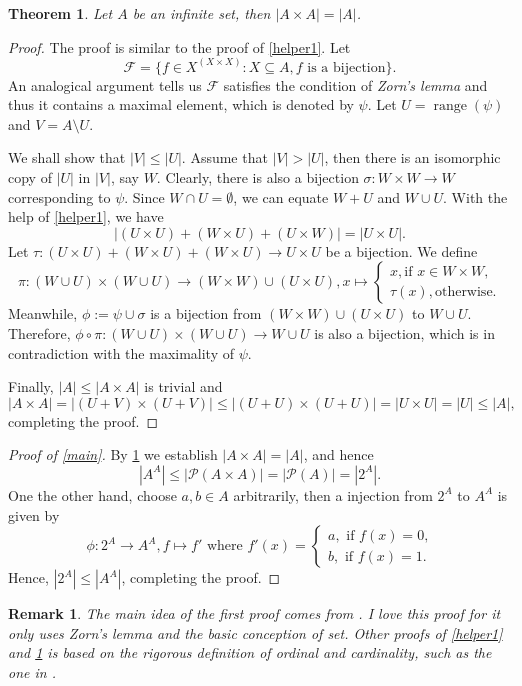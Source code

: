 \documentclass[12pt]{article}
\theoremstyle{mythm}
\newtheorem{theorem}{Theorem}
\newtheorem*{remark}{Remark}
\newcommand\pp{\mathcal{P}}
\newcommand\ff{\mathcal{F}}
\DeclareMathOperator{\range}{range}
\begin{document}
\begin{theorem} \label{helper2}
    Let $A$ be an infinite set, then $|A \times A| = |A|$. 
\end{theorem}  

\begin{proof}
    The proof is similar to the proof of \cref{helper1}. Let
    $$
    \ff = \{f \in X^{(X \times X)} : X \subseteq A, f \text{ is a bijection}\}.
    $$
    An analogical argument tells us $\ff$ satisfies the condition of \textit{Zorn's lemma}
    and thus it contains a maximal element, which is denoted by $\psi$. 
    Let $U = \range(\psi)$ and $V = A \setminus U$. 
    
    We shall show that 
    $|V| \leq |U|$. Assume that $|V| > |U|$, then there is an isomorphic copy of 
    $|U|$ in $|V|$, say $W$. Clearly, there is also a bijection 
    $\sigma : W \times W \to W$ corresponding to $\psi$.
    Since $W \cap U = \emptyset$, we can equate $W + U$ and $W \cup U$. 
    With the help of \cref{helper1}, we have 
    $$
    |(U \times U) + (W \times U) + (U \times W)| = |U \times U|.
    $$
    Let $\tau : (U \times U) + (W \times U) + (W \times U) \to U \times U$ be a bijection.
    We define 
    $$
        \pi : (W\cup U) \times (W \cup U) \to (W \times W) \cup (U \times U), 
        x \mapsto \begin{cases}
            x ,  \text{if $x \in W \times W$}, \\
            \tau(x), \text{otherwise}.
        \end{cases}
    $$
    Meanwhile, $\phi := \psi \cup \sigma$ is a bijection from 
    $(W \times W) \cup (U \times U)$ to $W \cup U$. Therefore, 
    $\phi \circ \pi : (W\cup U) \times (W \cup U) \to W \cup U$ is 
    also a bijection, which is in contradiction with the maximality of $\psi$.

    Finally, $|A| \leq |A \times A|$ is trivial and
    $$
    |A \times A| = |(U+V) \times (U+V)| \leq |(U+U) \times (U+U)| = |U \times U| = |U| \leq |A|,
    $$
    completing the proof.
\end{proof}

\begin{proof}[Proof of \cref{main}]
By \cref{helper2} we establish $|A \times A| = |A|$,
and hence 
$$
|A^A| \leq |\pp(A \times A)| = |\pp(A)| = |2^A|.
$$
One the other hand, choose $a,b \in A$ arbitrarily, then a injection 
from $2^A$ to $A^A$ is given by 
$$
\phi : 2^A \to A^A, f \mapsto f' \text{ where }
f'(x) = \begin{cases}
    a, \text{ if $f(x) = 0$,} \\
    b, \text{ if $f(x) = 1$.}
\end{cases}
$$
Hence, $|2^A| \leq |A^A|$, completing the proof.
\end{proof}

\begin{remark}
    The main idea of the first proof comes from \cite{Dong88}.
    I love this proof for it only uses \textit{Zorn's lemma}
    and the basic conception of set. 
    Other proofs of \cref{helper1} and \cref{helper2} is based on the rigorous definition of 
    \textit{ordinal} and \textit{cardinality}, such 
    as the one in \cite{Li19}.
\end{remark}


\end{document}
